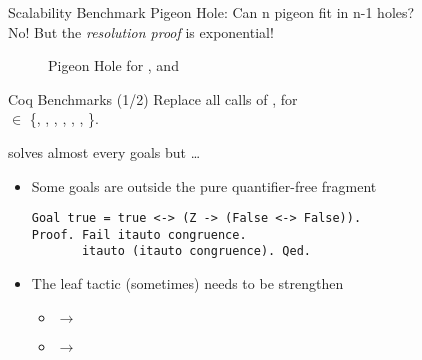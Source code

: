 \documentclass{beamer}
\begin{document}
\begin{frame}{Scalability Benchmark}
  Pigeon Hole: Can n pigeon fit in n-1 holes?\\
  No! But the \emph{resolution proof} is exponential!\\
  \bigskip
  \begin{figure}
  \centering
  \qquad
  \caption{Pigeon Hole for ,  and }
  \label{fig:pigeon}
\end{figure}

\end{frame}

\begin{frame}[fragile]{Coq Benchmarks (1/2)}
  Replace all calls of ,  for\\
   $\in$ \{, ,
  , , , ,
   \}.\\
  \medskip
  
   solves almost every goals but \dots
  \begin{itemize}
  \item Some goals are outside the pure quantifier-free fragment
\begin{verbatim}
Goal true = true <-> (Z -> (False <-> False)).
Proof. Fail itauto congruence.
       itauto (itauto congruence). Qed.
\end{verbatim}
  \item The leaf tactic (sometimes) needs to be strengthen
    \begin{itemize}
    \item {} $\to$ 
    \item {} $\to$ 
    \end{itemize}
  \end{itemize}

\end{frame}
\end{document}
